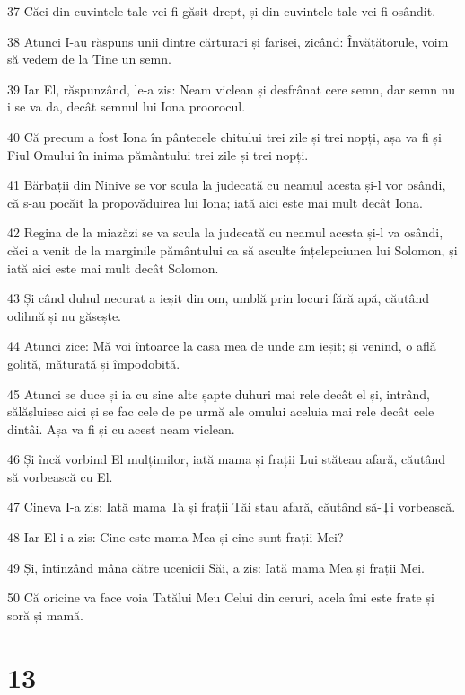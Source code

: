 \par 37 Căci din cuvintele tale vei fi găsit drept, și din cuvintele tale vei fi osândit.
\par 38 Atunci I-au răspuns unii dintre cărturari și farisei, zicând: Învățătorule, voim să vedem de la Tine un semn.
\par 39 Iar El, răspunzând, le-a zis: Neam viclean și desfrânat cere semn, dar semn nu i se va da, decât semnul lui Iona proorocul.
\par 40 Că precum a fost Iona în pântecele chitului trei zile și trei nopți, așa va fi și Fiul Omului în inima pământului trei zile și trei nopți.
\par 41 Bărbații din Ninive se vor scula la judecată cu neamul acesta și-l vor osândi, că s-au pocăit la propovăduirea lui Iona; iată aici este mai mult decât Iona.
\par 42 Regina de la miazăzi se va scula la judecată cu neamul acesta și-l va osândi, căci a venit de la marginile pământului ca să asculte înțelepciunea lui Solomon, și iată aici este mai mult decât Solomon.
\par 43 Și când duhul necurat a ieșit din om, umblă prin locuri fără apă, căutând odihnă și nu găsește.
\par 44 Atunci zice: Mă voi întoarce la casa mea de unde am ieșit; și venind, o află golită, măturată și împodobită.
\par 45 Atunci se duce și ia cu sine alte șapte duhuri mai rele decât el și, intrând, sălășluiesc aici și se fac cele de pe urmă ale omului aceluia mai rele decât cele dintâi. Așa va fi și cu acest neam viclean.
\par 46 Și încă vorbind El mulțimilor, iată mama și frații Lui stăteau afară, căutând să vorbească cu El.
\par 47 Cineva I-a zis: Iată mama Ta și frații Tăi stau afară, căutând să-Ți vorbească.
\par 48 Iar El i-a zis: Cine este mama Mea și cine sunt frații Mei?
\par 49 Și, întinzând mâna către ucenicii Săi, a zis: Iată mama Mea și frații Mei.
\par 50 Că oricine va face voia Tatălui Meu Celui din ceruri, acela îmi este frate și soră și mamă.

\chapter{13}

